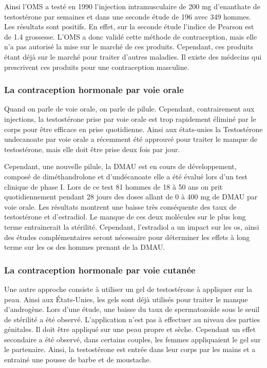 \documentclass[12pt,a4paper]{report}
\begin{document}
Ainsi l'OMS a testé en 1990 l'injection intramusculaire de 200 mg d'enanthate de testostérone par semaines et dans une seconde étude de 196 avec 349 hommes. Les résultats sont positifs. En effet, sur la seconde étude l'indice de Pearson est de 1.4 grossesse. \cite{guerinContraceptionMasculineHormonale1996}
L'OMS a donc validé cette méthode de contraception, mais elle n'a pas autorisé la mise sur le marché de ces produits. Cependant, ces produits étant déjà sur le marché pour traiter d'autres maladies. \cite{anne-sophiedelcourHommeSousPilule} Il existe des médecins qui prescrivent ces produits pour une contraception masculine. \cite{guillaumedaudinContraceptesEnqueteDernier2022}

\subsubsection{La contraception hormonale par voie orale}

Quand on parle de voie orale, on parle de pilule.
Cependant, contrairement aux injections, la testostérone prise par voie orale est trop rapidement éliminé par le corps pour être efficace en prise quotidienne.
Ainsi aux états-unies la Testostérone undecanoate par voie orale a récemment été approuvé pour traiter le manque de testostérone, mais elle doit être prise deux fois par jour. \cite{longUpdateNovelHormonal2021}

Cependant, une nouvelle pilule, la DMAU est en cours de développement, composé de diméthandrolone et d'undécanoate \cite{medisitePiluleContraceptivePour} elle a été évalué lors d'un test clinique de phase I.
Lors de ce test 81 hommes de 18 à 50 ans on prit quotidiennement pendant 28 jours des doses allant de 0 à 400 mg de DMAU par voie orale. 
Les résultats montrent une baisse très conséquente des taux de testostérone et d'estradiol. Le manque de ces deux molécules sur le plus long terme entrainerait la stérilité.
Cependant, l'estradiol a un impact sur les os, ainsi des études complémentaires seront nécessaire pour déterminer les effets à long terme sur les os des hommes prenant de la DMAU.  \cite{longUpdateNovelHormonal2021}\cite{thirumalaiDimethandroloneUndecanoateNovel2020}

\subsubsection{La contraception hormonale par voie cutanée}

Une autre approche consiste à utiliser un gel de testostérone à appliquer sur la peau. Ainsi aux États-Unies, les gels sont déjà utilisés pour traiter le manque d'androgène. 
Lors d'une étude, une baisse du taux de spermatozoïde sous le seuil de stérilité a été observé. \cite{longUpdateNovelHormonal2021}
L'application n'est pas à effectuer au niveau des parties génitales. Il doit être appliqué sur une peau propre et sèche. \cite{NoticePatientANDROGEL}
Cependant un effet secondaire a été observé, dans certains couples, les femmes appliquaient le gel sur le partenaire. Ainsi, la testostérone est entrée dans leur corps par les mains et a entrainé une pousse de barbe et de moustache. \cite{leblobContraceptionMasculineOu2021}
\end{document}
